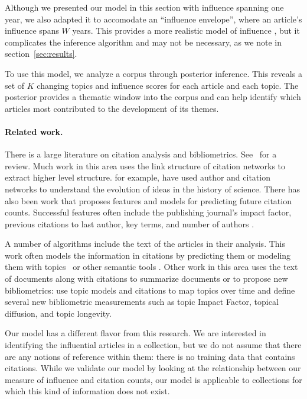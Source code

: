 Although we presented our model in this section with influence
spanning one year, we also adapted it to accomodate an ``influence
envelope'', where an article's influence spans $W$ years.  This
provides a more realistic model of influence \cite{porter:2005}, but
it complicates the inference algorithm and may not be necessary, as we
note in section~\ref{sec:results}.


To use this model, we analyze a corpus through posterior inference.
This reveals a set of $K$ changing topics and influence scores for
each article and each topic.  The posterior provides a thematic window
into the corpus and can help identify which articles most contributed
to the development of its themes.

\vspace{-29pt}
\paragraph{Related work.}
There is a large literature on citation analysis and bibliometrics.
See~\cite{osareh:1996} for a review.  Much work in this area uses the %
link structure of citation networks to extract higher level structure.
\cite{borner:2003} for example, have used author and citation %
networks to understand the evolution of ideas in the history of
science.  There has also been work that proposes features and models
for predicting future citation counts.  Successful features often
include the publishing journal's impact factor, previous citations to
last author, key terms, and number of authors
\cite{tang:2009,lokker:2008}.

A number of algorithms include the text of the articles in their
analysis.  This work often models the information in citations by
predicting them or modeling them with
topics~\cite{nallapati:2008,chang:2009,dietz:2007,Cohn01themissing} or
other semantic tools \cite{mcnee:2002,ibanez:2009}.  Other work in
this area uses the text of documents along with citations to summarize
documents \cite{qazvinian:2008} or to propose new bibliometrics:
\cite{mann:2006} use topic models and citations to map topics over %
time and define several new bibliometric measurements such as topic
Impact Factor, topical diffusion, and topic longevity.

Our model has a different flavor from this research.  We are
interested in identifying the influential articles in a collection,
but we do not assume that there are any notions of reference within
them: there is no training data that contains citations.  While we
validate our model by looking at the relationship between our measure
of influence and citation counts, our model is applicable to
collections for which this kind of information does not exist.

